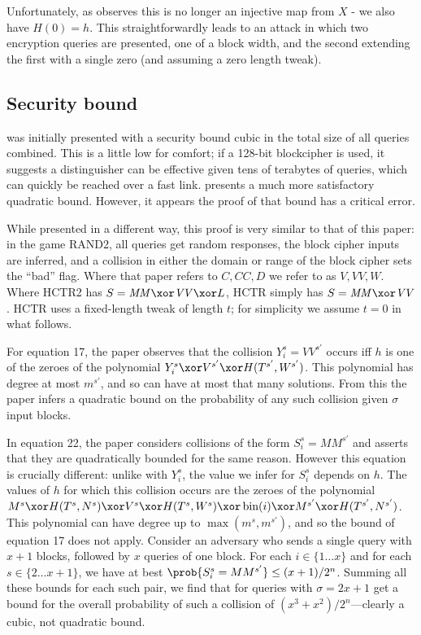 \documentclass[letterpaper,11pt]{article}
\newcommand*{\MM}{\mathit{MM}}
\newcommand*{\VV}{\mathit{VV}}
\DeclareMathOperator{\fromint}{bin}
\begin{document}
Unfortunately, as \cite{kumarhctr} observes this is no longer
an injective map from \(X\) - we also have \(H(0) = h\). This
straightforwardly leads to an attack in which two encryption queries
are presented, one of a block width, and the second extending
the first with a single zero (and assuming a zero length tweak).

\subsection{Security bound}
\cite{hctr} was initially presented with a security bound cubic
in the total size of all queries combined.  This is a little low
for comfort; if a 128-bit blockcipher is used, it suggests a
distinguisher can be effective given tens of terabytes of queries,
which can quickly be reached over a fast link. 
\cite{hctrquad} presents a much more satisfactory quadratic bound.
However, it appears the proof of that bound has a critical error.

While presented in a different way, this proof is very similar
to that of this paper: in the game RAND2, all queries get random
responses, the block cipher inputs are inferred, and a collision
in either the domain or range of the block cipher
sets the ``bad'' flag. Where that paper refers to 
\(C, \mathit{CC}, D\)
we refer to as \(V, VV, W\). Where HCTR2 has
\(S = \MM \xor \VV \xor L\), HCTR simply has
\(S = \MM \xor \VV\). HCTR uses a fixed-length tweak
of length \(t\); for simplicity we assume \(t = 0\)
in what follows.

For equation 17, the paper observes that the collision
\(Y_i^s = VV^{s'}\) occurs iff \(h\) is one of the zeroes
of the polynomial \(Y_i^s \xor V^{s'} \xor H(T^{s'}, W^{s'})\).
This polynomial has degree at most
\(m^{s'}\), and so can have
at most that many solutions. From this the paper infers
a quadratic bound on the probability of any such collision
given \(\sigma\) input blocks.

In equation 22, the paper considers collisions of the form 
\(S_i^s = MM^{s'}\) and asserts that they are
quadratically bounded for the same reason. However this equation
is crucially different: unlike with \(Y_i^s\), the value we
infer for \(S_i^s\) depends on \(h\). The values of \(h\)
for which this collision occurs are
the zeroes of the polynomial
\(M^s \xor H(T^s, N^s)
\xor V^s \xor H(T^s, W^s) \xor \fromint(i) 
\xor M^{s'} \xor H(T^{s'}, N^{s'})\).
This polynomial can have degree up to 
\(\max(m^s, m^{s'})\), and so the bound of
equation 17 does not apply.
Consider an adversary who
sends a single query with \(x+1\) blocks, followed by
\(x\) queries of one block. For each \(i \in \{1\ldots x\}\) and
for each \(s \in \{2 \ldots x + 1\}\), we have at best
\(\prob{S_i^s = MM^{s'}} \leq (x + 1)/2^n\). Summing
all these bounds for each such pair, we find that
for queries with \(\sigma = 2x + 1\)
get a bound for the overall probability of such a collision of 
\((x^3 + x^2)/2^n\)---clearly a cubic, not quadratic bound.
\end{document}
